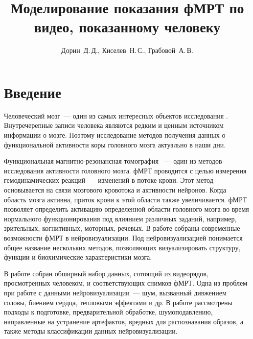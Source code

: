 \documentclass[12pt,twoside]{article}
\title
    [Моделирование показания фМРТ по видео, показанному человеку] %
    {Моделирование показания фМРТ по видео, показанному человеку}
\author
    [Дорин~Д.\,Д.] %
    {Дорин~Д.\,Д., Киселев~Н.\,С., Грабовой~А.\,В.} %
    [Дорин~Д.\,Д.$^{1,2}$, Грабовой~А.\,В.$^2$] %
\begin{document}
\maketitle
\section{Введение}
Человеческий мозг~--- один из самых интересных объектов исследования \citep{Zhumakova}. 
Внутречерепные записи человека являются редким и ценным источником информации о мозге.
Поэтому исследование методов получения данных о функциональной активности коры 
головного мозга актуально в наши дни.

Функциональная магнитно-резонансная томография \citep{Ushakov}~--- один из методов исследования активности головного мозга.
фМРТ проводится с целью измерения гемодинамических реакций~--- изменений в потоке крови. 
Этот метод основывается на связи мозгового кровотока и активности нейронов. Когда область мозга активна, 
приток крови к этой области также увеличивается. 
фМРТ позволяет определить активацию определенной области головного мозга во время нормального функционирования под 
влиянием различных заданий, например, зрительных, когнитивных,  моторных,  речевых.
В работе \citep{Belyaevskaya2018} собраны современные возможности фМРТ в нейровизуализации. 
Под нейровизуализацией понимается общее название нескольких методов, позволяющих визуализировать структуру, функции и биохимические характеристики мозга.

В работе \citep{Berezutskaya2022} собран обширный набор данных, сотоящий из видеорядов, просмотренных 
человеком, и соответствующих снимков фМРТ. Одна из проблем при работе с данными нейровизуализации~--- шум, вызванный 
дивжением головы, биением сердца, тепловыми эффектами и др. 
В работе \citep{https://doi.org/10.48550/arxiv.1804.10167} рассмотрены подходы к подготовке,
предварительной обработке, шумоподавлению, направленные на устранение артефактов, вредных 
для распознавания образов, а также методы классификации данных нейровизуализации.
\end{document}
